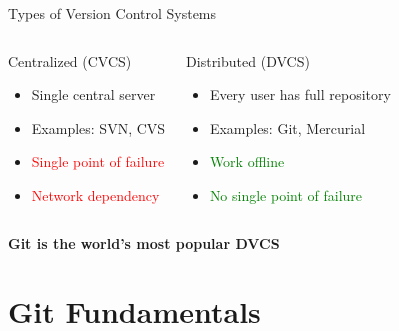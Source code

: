 \documentclass[aspectratio=169]{beamer}
\begin{document}
	\begin{frame}{Types of Version Control Systems}
		\begin{columns}[T]
			\begin{block}{Centralized (CVCS)}
				\begin{itemize}
					\item Single central server
					\item Examples: SVN, CVS
					\item \textcolor{red}{Single point of failure}
					\item \textcolor{red}{Network dependency}
				\end{itemize}
			\end{block}
			
			\begin{block}{Distributed (DVCS)}
				\begin{itemize}
					\item Every user has full repository
					\item Examples: Git, Mercurial
					\item \textcolor{green}{Work offline}
					\item \textcolor{green}{No single point of failure}
				\end{itemize}
			\end{block}
		\end{columns}
		
		\vspace{0.5cm}
		\begin{center}
			\textbf{Git is the world's most popular DVCS}
		\end{center}
	\end{frame}
	
	\section{Git Fundamentals}
	
\end{document}
